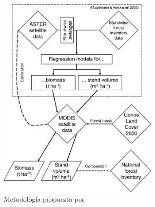 \begin{figure}
  \centering
  \includegraphics[width = 8cm]{Mukkonnen01.png}
  \caption{Metodología propuesta por \cite{muukkonen2007biomass}}
  \label{fig:Mukkonnen01}
\end{figure}

